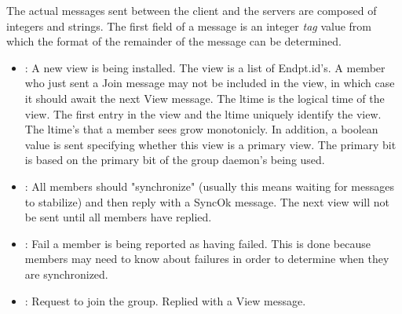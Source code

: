The actual messages sent between the client and the servers are composed of integers
and strings.  The first field of a message is an integer \emph{tag} value from which
the format of the remainder of the message can be determined.

\begin{itemize}
\item 

 : A new view is being installed.  The view is a
list of Endpt.id's.  A member who just sent a Join message may not be
included in the view, in which case it should await the next View
message.  The ltime is the logical time of the view.  The first entry
in the view and the ltime uniquely identify the view.  The ltime's
that a member sees grow monotonicly.  In addition, a boolean value is
sent specifying whether this view is a primary view.  The primary bit
is based on the primary bit of the group daemon's being used.
\begin{FormatTable}
\end{FormatTable}
\item 
{} : All members should "synchronize" (usually this
means waiting for messages to stabilize) and then reply with a SyncOk
message.  The next view will not be sent until all members have
replied.
\begin{FormatTable}
\end{FormatTable}
\item 
{} : Fail a member is being reported as having
failed.  This is done because members may need to know about failures
in order to determine when they are synchronized.
\begin{FormatTable}
\end{FormatTable}
\item 
{} : Request to join the group.  Replied with a
View message.
\begin{FormatTable}

\end{FormatTable}
\end{itemize}

